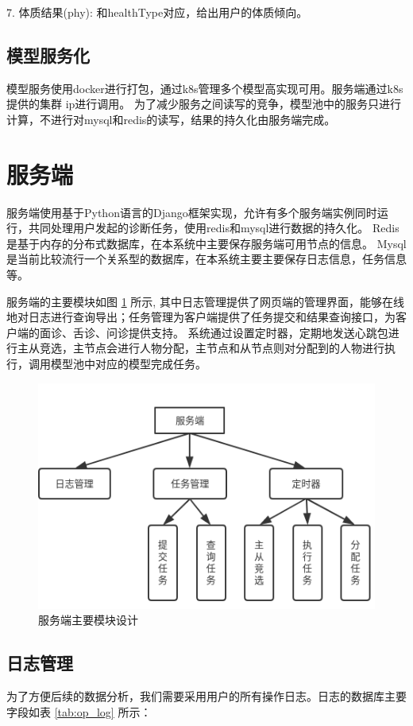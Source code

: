 7. 体质结果(phy): 和healthType对应，给出用户的体质倾向。

\subsection{模型服务化}

模型服务使用docker进行打包，通过k8s管理多个模型高实现可用。服务端通过k8s提供的集群 ip进行调用。
为了减少服务之间读写的竞争，模型池中的服务只进行计算，不进行对mysql和redis的读写，结果的持久化由服务端完成。

\section{服务端}

服务端使用基于Python语言的Django框架实现，允许有多个服务端实例同时运行，共同处理用户发起的诊断任务，使用redis和mysql进行数据的持久化。
Redis是基于内存的分布式数据库，在本系统中主要保存服务端可用节点的信息。
Mysql是当前比较流行一个关系型的数据库，在本系统主要主要保存日志信息，任务信息等。       

服务端的主要模块如图 \ref{fig:server} 所示, 其中日志管理提供了网页端的管理界面，能够在线地对日志进行查询导出；任务管理为客户端提供了任务提交和结果查询接口，为客户端的面诊、舌诊、问诊提供支持。
系统通过设置定时器，定期地发送心跳包进行主从竞选，主节点会进行人物分配，主节点和从节点则对分配到的人物进行执行，调用模型池中对应的模型完成任务。


\begin{figure}[ht]
    \centering
    \includegraphics[width=12cm]{images/server.png}
    \caption{服务端主要模块设计}
    \label{fig:server}
\end{figure}


\subsection{日志管理}
为了方便后续的数据分析，我们需要采用用户的所有操作日志。日志的数据库主要字段如表 \ref{tab:op_log} 所示：

